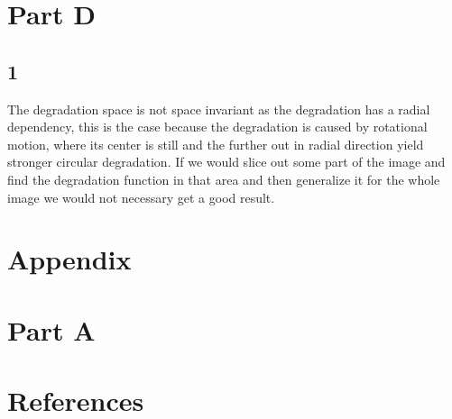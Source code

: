 {\section{Part D}
\subsection{1}

The degradation space is not space invariant as the degradation has a radial dependency, this is the case because the degradation is caused by rotational motion, where its center is still and the further out in radial direction yield stronger circular degradation. If we would slice out some part of the image and find the degradation function in that area and then generalize it for the whole image we would not necessary get a good result.





\newpage
\section{Appendix}



\section{Part A}









\section{References}
\begingroup
\renewcommand{\section}[2]{}%


\endgroup















 








